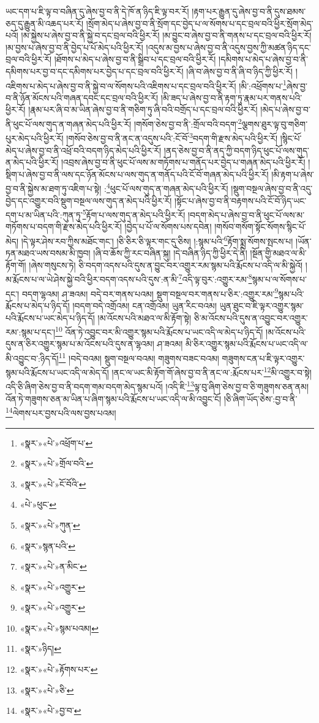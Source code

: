 ཡང་དག་པ་ཇི་ལྟ་བ་བཞིན་དུ་ཞེས་བྱ་བ་ནི་དེ་ཁོ་ན་ཉིད་ཇི་ལྟ་བར་རོ། །རྟག་པར་རྒྱུན་དུ་ཞེས་བྱ་བ་ནི་དུས་ཐམས་ཅད་དུ་རྒྱུན་མི་འཆད་པར་རོ། །སྲོག་མེད་པ་ཞེས་བྱ་བ་ནི་སྲོག་དང་བྱེད་པ་ལ་སོགས་པ་དང་བྲལ་བའི་ཕྱིར་སྲོག་མེད་པའོ། །མ་སྐྱེས་པ་ཞེས་བྱ་བ་ནི་སྐྱེ་བ་དང་བྲལ་བའི་ཕྱིར་རོ། །མ་བྱུང་བ་ཞེས་བྱ་བ་ནི་གནས་པ་དང་བྲལ་བའི་ཕྱིར་རོ། །མ་བྱས་པ་ཞེས་བྱ་བ་ནི་བྱེད་པ་པོ་མེད་པའི་ཕྱིར་རོ། །འདུས་མ་བྱས་པ་ཞེས་བྱ་བ་ནི་འདུས་བྱས་ཀྱི་མཚན་ཉིད་དང་བྲལ་བའི་ཕྱིར་རོ། །ཐོགས་པ་མེད་པ་ཞེས་བྱ་བ་ནི་སྒྲིབ་པ་དང་བྲལ་བའི་ཕྱིར་རོ། །དམིགས་པ་མེད་པ་ཞེས་བྱ་བ་ནི་དམིགས་པར་བྱ་བ་དང་དམིགས་པར་བྱེད་པ་དང་བྲལ་བའི་ཕྱིར་རོ། །ཞི་བ་ཞེས་བྱ་བ་ནི་ཞི་བ་ཉིད་ཀྱི་ཕྱིར་རོ། །འཇིགས་པ་མེད་པ་ཞེས་བྱ་བ་ནི་སྐྱེ་བ་ལ་སོགས་པའི་འཇིགས་པ་དང་བྲལ་བའི་ཕྱིར་རོ། །མི་:འཕྲོགས་པ་\footnote{«སྣར་»«པེ་»འཕྲོག་པ་}ཞེས་བྱ་བ་ནི་ཉོན་མོངས་པའི་གཞན་དབང་དང་བྲལ་བའི་ཕྱིར་རོ། །མི་ཟད་པ་ཞེས་བྱ་བ་ནི་རྟག་ཏུ་རྣམ་པར་གནས་པའི་ཕྱིར་རོ། །རྣམ་པར་ཞི་བ་མ་ཡིན་ཞེས་བྱ་བ་ནི་གཅིག་ཏུ་ཞི་བའི་བགྲོད་པ་དང་བྲལ་བའི་ཕྱིར་རོ། །མེད་པ་ཞེས་བྱ་བ་ནི་ཕུང་པོ་ལས་གུད་ན་གཞན་མེད་པའི་ཕྱིར་རོ། །གསོག་ཅེས་བྱ་བ་ནི་:གྲོལ་བའི་བདག་\footnote{«སྣར་»«པེ་»གྲོལ་བའི་}ལྕགས་ཐུར་ལྟ་བུ་གཅིག་པུར་མེད་པའི་ཕྱིར་རོ། །གསོབ་ཅེས་བྱ་བ་ནི་ནང་ན་འདུས་པའི་:ངོ་བོ་\footnote{«སྣར་»«པེ་»ངོ་བོའི་}བདག་གི་རྫས་མེད་པའི་ཕྱིར་རོ། །སྙིང་པོ་མེད་པ་ཞེས་བྱ་བ་ནི་འཕྲོ་བའི་བདག་ཉིད་མེད་པའི་ཕྱིར་རོ། །ནད་ཅེས་བྱ་བ་ནི་ནད་ཀྱི་བདག་ཉིད་ཕུང་པོ་ལས་གུད་ན་མེད་པའི་ཕྱིར་རོ། །འབྲས་ཞེས་བྱ་བ་ནི་ཕུང་པོ་ལས་མ་གཏོགས་པ་གནོད་པར་བྱེད་པ་གཞན་མེད་པའི་ཕྱིར་རོ། །སྡིག་པ་ཞེས་བྱ་བ་ནི་ལས་དང་ཉོན་མོངས་པ་ལས་གུད་ན་གནོད་པའི་ངོ་བོ་གཞན་མེད་པའི་ཕྱིར་རོ། །མི་རྟག་པ་ཞེས་བྱ་བ་ནི་སྐྱེས་མ་ཐག་ཏུ་འཇིག་པ་སྟེ། :\footnote{«པེ་»ཕུང་}ཕུང་པོ་ལས་གུད་ན་གཞན་མེད་པའི་ཕྱིར་རོ། །སྡུག་བསྔལ་ཞེས་བྱ་བ་ནི་འདུ་བྱེད་དང་འགྱུར་བའི་སྡུག་བསྔལ་ལས་གུད་ན་མེད་པའི་ཕྱིར་རོ། །སྟོང་པ་ཞེས་བྱ་བ་ནི་བརྟགས་པའི་ངོ་བོ་ཉིད་ཡང་དག་པ་མ་ཡིན་པའི་:ཀུན་ཏུ་\footnote{«སྣར་»«པེ་»ཀུན་}རྟོག་པ་ལས་གུད་ན་མེད་པའི་ཕྱིར་རོ། །བདག་མེད་པ་ཞེས་བྱ་བ་ནི་ཕུང་པོ་ལས་མ་གཏོགས་པ་བདག་གི་རྫས་མེད་པའི་ཕྱིར་རོ། །བྱེད་པ་པོ་ལ་སོགས་པས་དབེན། །གསོབ་གསོག་སྟོང་སོགས་སྙིང་པོ་མེད། །དེ་ལྟར་ཤེས་རབ་ཀྱིས་མཐོང་གང་། །ཅི་ཅིར་ཅི་ལྟར་གང་དུ་ཅིས། །:སྙམ་པའི་\footnote{«སྣར་»སྙན་པའི་}རྟོག་སྨྲ་སོགས་སྤངས་པ། །ཡོན་ཏན་མཐའ་ཡས་བསམ་མི་ཁྱབ། །ཞི་བ་ཆོས་ཀྱི་རང་བཞིན་སྐུ། །དེ་བཞིན་ཉིད་ཀྱི་ཕྱིར་དེ་ནི། །སྔོན་གྱི་མཐའ་ལ་མི་རྟོག་གོ། །ཞེས་གསུངས་ཏེ། ཅི་བདག་འདས་པའི་དུས་ན་བྱུང་བར་འགྱུར་རམ་སྙམ་པའི་རྨོངས་པ་འདི་ལ་མི་སྐྱེའོ། །མ་རྨོངས་པ་ལ་ཡེ་ཤེས་སྐྱེ་བའི་ཕྱིར་བདག་འདས་པའི་དུས་:ན་མི་\footnote{«སྣར་»«པེ་»ན་མིང་}འདི་ལྟ་བུར་:འགྱུར་རམ་\footnote{«སྣར་»«པེ་»འགྱུར་}སྙམ་པ་ལ་སོགས་པ་དང་། བདག་ལྷའམ། ཤ་ཟའམ། བདེ་བར་གནས་པའམ། སྡུག་བསྔལ་བར་གནས་པ་ཅིར་:འགྱུར་རམ་\footnote{«སྣར་»«པེ་»འགྱུར་}སྙམ་པའི་རྨོངས་པ་མེད་པ་ཉིད་དོ། །བདག་བདེ་འགྲོའམ། ངན་འགྲོའམ། ཡུན་རིང་བའམ། ཡུན་ཐུང་བ་ཇི་ལྟར་འགྱུར་སྙམ་པའི་རྨོངས་པ་ཡང་མེད་པ་ཉིད་དོ། །མ་འོངས་པའི་མཐའ་ལ་མི་རྟོག་སྟེ། ཅི་མ་འོངས་པའི་དུས་ན་འབྱུང་བར་འགྱུར་རམ་:སྙམ་པ་དང་།\footnote{«སྣར་»«པེ་»སྙམ་པའམ།} འོན་ཏེ་འབྱུང་བར་མི་འགྱུར་སྙམ་པའི་རྨོངས་པ་ཡང་འདི་ལ་མེད་པ་ཉིད་དོ། །མ་འོངས་པའི་དུས་ན་ཅིར་འགྱུར་སྙམ་པ་མ་འོངས་པའི་དུས་ན་ལྷའམ། ཤ་ཟའམ། མི་ཅིར་འགྱུར་སྙམ་པའི་རྨོངས་པ་ཡང་འདི་ལ་མི་འབྱུང་བ་:ཉིད་དོ།\footnote{«སྣར་»ཉིད།} །བདེ་བའམ། སྡུག་བསྔལ་བའམ། གཟུགས་བཟང་བའམ། གཟུགས་ངན་པ་ཇི་ལྟར་འགྱུར་སྙམ་པའི་རྨོངས་པ་ཡང་འདི་ལ་མེད་དོ། །ནང་ལ་ཡང་མི་རྟོག་གོ་ཞེས་བྱ་བ་ནི་ནང་ལ་:རྨོངས་པར་\footnote{«སྣར་»«པེ་»རྟོགས་པར་}མི་འགྱུར་བ་སྟེ། འདི་ཅི་ཞིག་ཅེས་བྱ་བ་ནི་བདག་གམ་བདག་མེད་སྙམ་པའོ། །འདི་ཇི་\footnote{«སྣར་»«པེ་»ཅི་}ལྟ་བུ་ཞིག་ཅེས་བྱ་བ་ཅི་གཟུགས་ཅན་ནམ། འོན་ཏེ་གཟུགས་ཅན་མ་ཡིན་པ་ཞིག་སྙམ་པའི་རྨོངས་པ་ཡང་འདི་ལ་མི་འབྱུང་ངོ། །ཅི་ཞིག་ཡོད་ཅེས་:བྱ་བ་ནི་\footnote{«སྣར་»«པེ་»བྱ་བ་}ལེགས་པར་བྱས་པའི་ལས་བྱས་པའམ། 